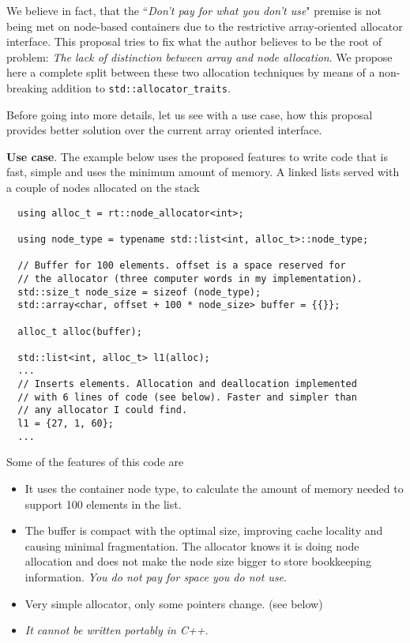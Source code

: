 \documentclass[11pt]{article}
\begin{document}
We believe in fact, that the ``{\it Don't pay for what you don't use}" premise
is not being met on node-based containers due to the restrictive
array-oriented allocator interface. This proposal tries to fix what the author
believes to be the root of problem: {\it The lack of distinction between array
and node allocation}.  We propose here a complete split between these two
allocation techniques by means of a non-breaking addition to
\texttt{std::allocator\_traits}.

Before going into more details, let us see with a use case,
how this proposal provides better solution over the current
array oriented interface.

\medskip
\noindent
{\bf Use case}. The example below uses the proposed features
to write code that is fast, simple and uses the minimum
amount of memory. A linked lists served with a couple of nodes
allocated on the stack
\medskip
\begin{lstlisting}
  using alloc_t = rt::node_allocator<int>;

  using node_type = typename std::list<int, alloc_t>::node_type;

  // Buffer for 100 elements. offset is a space reserved for
  // the allocator (three computer words in my implementation).
  std::size_t node_size = sizeof (node_type);
  std::array<char, offset + 100 * node_size> buffer = {{}};

  alloc_t alloc(buffer);

  std::list<int, alloc_t> l1(alloc);
  ...
  // Inserts elements. Allocation and deallocation implemented
  // with 6 lines of code (see below). Faster and simpler than
  // any allocator I could find.
  l1 = {27, 1, 60};
  ...
\end{lstlisting}

\newpage
Some of the features of this code are
\begin{itemize}

\item It uses the container node type, to calculate the amount of memory needed
to support 100 elements in the list.

\item The buffer is compact with the optimal size, improving
cache locality and causing minimal fragmentation. The allocator
knows it is doing node allocation and does not make the node size bigger to
store bookkeeping information.
{\it You do not pay for space you do not use}.
\item Very simple allocator, only some pointers change. (see below)
\item {\it It cannot be written portably in C++}.
\end{itemize}
\end{document}
